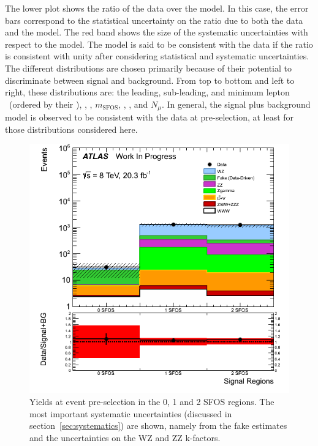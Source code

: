 The lower plot shows the ratio of the data over the model.
In this case, the error bars correspond to the statistical uncertainty
on the ratio due to both the data and the model. The red band
shows the size of the systematic uncertainties with respect to the model.
The model is said to be consistent with the data
if the ratio is consistent with unity after considering statistical
and systematic uncertainties.
The different distributions are chosen primarily because 
of their potential to discriminate between signal and background. 
From top to bottom and left to right,
these distributions are: the leading, sub-leading, and minimum lepton \pt~(ordered by their \pt),
\MET, \deltaphi, $m_{\textrm{SFOS}}$, \njet, \nbjet, and $N_{\mu}$.
In general, the signal plus background model is observed to be consistent
with the data at pre-selection, at least for those distributions
considered here.




%



\begin{figure}[ht!]
\centering
\includegraphics[width=0.5\columnwidth]{figures/SFOSPreselection.png}
\caption{Yields at event pre-selection in the 0, 1 and 2 SFOS regions.  
The most important systematic uncertainties 
(discussed in section~\ref{sec:systematics}) are shown, 
namely from the fake estimates and the uncertainties on the WZ and ZZ k-factors.}
\label{fig:preselection_nsfos}
\end{figure}

